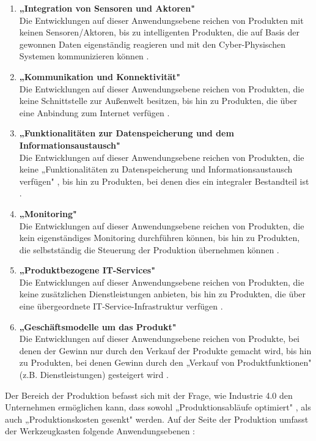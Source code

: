 \begin{enumerate}
	\item \textbf{„Integration von Sensoren und Aktoren"} \cite[S.13]{2} \\ Die Entwicklungen auf dieser Anwendungsebene reichen von Produkten mit keinen Sensoren/Aktoren, bis zu intelligenten Produkten, die auf Basis der gewonnen Daten eigenständig reagieren und mit den Cyber-Physischen Systemen kommunizieren können \cite[S.13]{2}.
	\item \textbf{„Kommunikation und Konnektivität"} \cite[S.13]{2} \\ Die Entwicklungen auf dieser Anwendungsebene reichen von Produkten, die keine Schnittstelle zur Außenwelt besitzen, bis hin zu Produkten, die über eine Anbindung zum Internet verfügen \cite[S.13]{2}.
	\item \textbf{„Funktionalitäten zur Datenspeicherung und dem Informationsaustausch"} \cite[S.13]{2} \\ Die Entwicklungen auf dieser Anwendungsebene reichen von Produkten, die keine „Funktionalitäten zu Datenspeicherung und Informationsaustausch verfügen" \cite[S.13]{2}, bis hin zu Produkten, bei denen dies ein integraler Bestandteil ist \cite[S.13]{2}.
	\item \textbf{„Monitoring"} \cite[S.13]{2} \\ Die Entwicklungen auf dieser Anwendungsebene reichen von Produkten, die kein eigenständiges Monitoring durchführen können, bis hin zu Produkten, die selbstständig die Steuerung der Produktion übernehmen können \cite[S.13]{2}.
	\item \textbf{„Produktbezogene IT-Services"} \cite[S.13]{2} \\ Die Entwicklungen auf dieser Anwendungsebene reichen von Produkten, die keine zusätzlichen Dienstleistungen anbieten, bis hin zu Produkten, die über eine übergeordnete IT-Service-Infrastruktur verfügen \cite[S.13]{2}.
	\item \textbf{„Geschäftsmodelle um das Produkt"} \cite[S.13]{2} \\ Die Entwicklungen auf dieser Anwendungsebene reichen von Produkte, bei denen der Gewinn nur durch den Verkauf der Produkte gemacht wird, bis hin zu Produkten, bei denen Gewinn durch den „Verkauf von Produktfunktionen" \cite[S.12]{2} (z.B. Dienstleistungen) gesteigert wird \cite[S.13]{2}.
\end{enumerate}
Der Bereich der Produktion befasst sich mit der Frage, wie Industrie 4.0 den Unternehmen ermöglichen kann, dass sowohl „Produktionsabläufe optimiert" \cite[S.15]{2}, als auch „Produktionskosten gesenkt" \cite[S.15]{2} werden. Auf der Seite der Produktion umfasst der Werkzeugkasten folgende Anwendungsebenen \cite[S.15]{2}:
